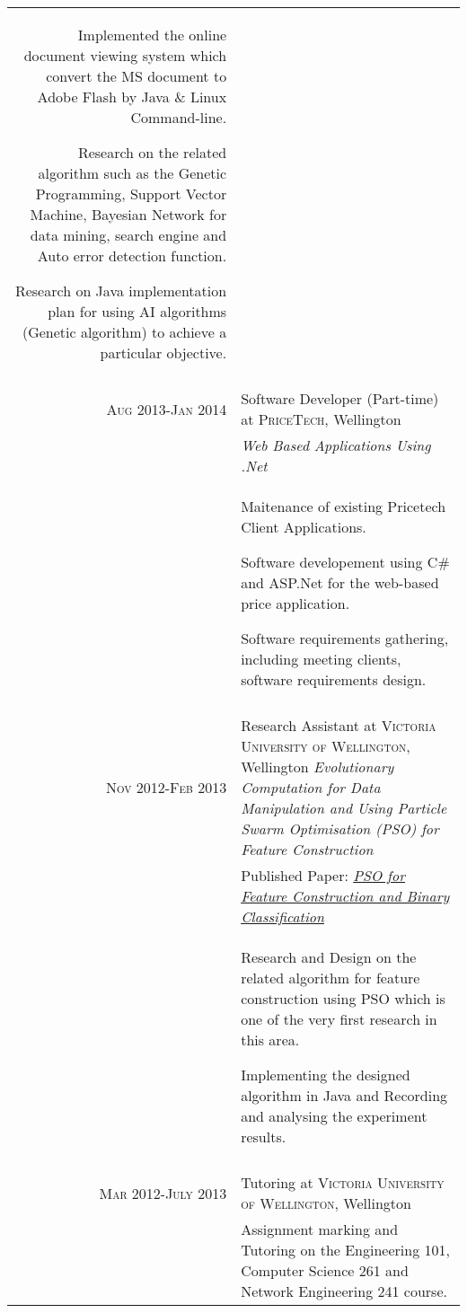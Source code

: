 \documentclass[a4paper,10pt]{article} %
\begin{document}
\begin{tabular}{r|p{11cm}}
{Implemented the online document viewing system which convert the MS document to Adobe Flash by Java \& Linux Command-line.

Research on the related algorithm such as the Genetic Programming, Support Vector Machine, Bayesian Network for data mining, search engine and Auto error detection function.

Research on Java implementation plan for using AI algorithms (Genetic algorithm) to achieve a particular objective.
}\\
\multicolumn{2}{c}{} \\


\textsc{Aug 2013-Jan 2014} & Software Developer (Part-time) at \textsc{PriceTech}, Wellington \\
& \emph{Web Based Applications Using .Net}\\ 
& \footnotesize{
Maitenance of existing Pricetech Client Applications.

Software developement using C\# and ASP.Net for the web-based price application.

Software requirements gathering, including meeting clients, software requirements design.
}\\
\multicolumn{2}{c}{} \\



\textsc{Nov 2012-Feb 2013} & Research Assistant at \textsc{Victoria University of Wellington}, Wellington \emph{Evolutionary Computation for Data Manipulation and Using Particle Swarm Optimisation (PSO) for Feature Construction}\\
& Published Paper: \emph{\href{http://dl.acm.org/citation.cfm?id=2463376}{PSO for Feature Construction and Binary Classification}}\\
& \footnotesize{
Research and Design on the related algorithm for feature construction using PSO which is one of the very first research in this area. 

Implementing the designed algorithm in Java and Recording and analysing the experiment results.
}\\
\multicolumn{2}{c}{} \\


\textsc{Mar 2012-July 2013} & Tutoring at \textsc{Victoria University of Wellington}, Wellington \emph{}\\
& \footnotesize{
Assignment marking and Tutoring on the Engineering 101, Computer Science 261 and Network Engineering 241 course.

}
\end{tabular}
\end{document}
